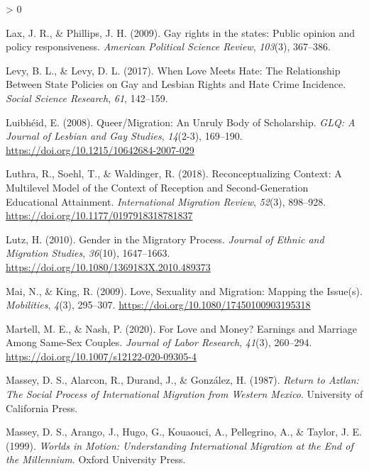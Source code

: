 \documentclass[
  11pt,
]{article}
\newlength{\cslhangindent}
\newenvironment{CSLReferences}[2] %
 {%
  \setlength{\parindent}{0pt}
  \ifodd #1 \everypar{\setlength{\hangindent}{\cslhangindent}}\ignorespaces\fi
  \ifnum #2 > 0
  \setlength{\parskip}{#2\baselineskip}
  \fi
 }%
 {}
\begin{document}
\begin{CSLReferences}{1}{0}
\leavevmode\hypertarget{ref-lax_2009}{}%
Lax, J. R., \& Phillips, J. H. (2009). Gay rights in the states: {Public} opinion and policy responsiveness. \emph{American Political Science Review}, \emph{103}(3), 367--386.

\leavevmode\hypertarget{ref-levy_2017}{}%
Levy, B. L., \& Levy, D. L. (2017). When {Love Meets Hate}: {The Relationship Between State Policies} on {Gay} and {Lesbian Rights} and {Hate Crime Incidence}. \emph{Social Science Research}, \emph{61}, 142--159.

\leavevmode\hypertarget{ref-luibheid_2008}{}%
Luibhéid, E. (2008). Queer/{Migration}: {An Unruly Body} of {Scholarship}. \emph{GLQ: A Journal of Lesbian and Gay Studies}, \emph{14}(2-3), 169--190. \url{https://doi.org/10.1215/10642684-2007-029}

\leavevmode\hypertarget{ref-luthra_2018}{}%
Luthra, R., Soehl, T., \& Waldinger, R. (2018). Reconceptualizing {Context}: {A Multilevel Model} of the {Context} of {Reception} and {Second}-{Generation Educational Attainment}. \emph{International Migration Review}, \emph{52}(3), 898--928. \url{https://doi.org/10.1177/0197918318781837}

\leavevmode\hypertarget{ref-lutz_2010}{}%
Lutz, H. (2010). Gender in the {Migratory Process}. \emph{Journal of Ethnic and Migration Studies}, \emph{36}(10), 1647--1663. \url{https://doi.org/10.1080/1369183X.2010.489373}

\leavevmode\hypertarget{ref-mai_2009}{}%
Mai, N., \& King, R. (2009). Love, {Sexuality} and {Migration}: {Mapping} the {Issue}(s). \emph{Mobilities}, \emph{4}(3), 295--307. \url{https://doi.org/10.1080/17450100903195318}

\leavevmode\hypertarget{ref-martell_2020}{}%
Martell, M. E., \& Nash, P. (2020). For {Love} and {Money}? {Earnings} and {Marriage Among Same}-{Sex Couples}. \emph{Journal of Labor Research}, \emph{41}(3), 260--294. \url{https://doi.org/10.1007/s12122-020-09305-4}

\leavevmode\hypertarget{ref-massey_1987}{}%
Massey, D. S., Alarcon, R., Durand, J., \& González, H. (1987). \emph{Return to {Aztlan}: {The Social Process} of {International Migration} from {Western Mexico}}. {University of California Press}.

\leavevmode\hypertarget{ref-massey_1999}{}%
Massey, D. S., Arango, J., Hugo, G., Kouaouci, A., Pellegrino, A., \& Taylor, J. E. (1999). \emph{Worlds in {Motion}: {Understanding International Migration} at the {End} of the {Millennium}}. {Oxford University Press}.


\end{CSLReferences}
\end{document}
